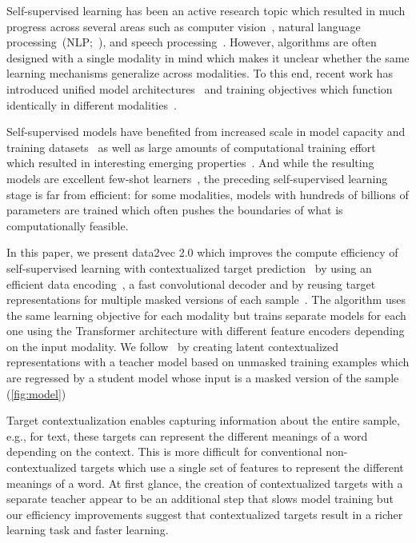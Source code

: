 \documentclass[nohyperref]{article}
\theoremstyle{plain}
\theoremstyle{definition}
\theoremstyle{remark}
\newcommand{\name}{data2vec 2.0}
\begin{document}
Self-supervised learning has been an active research topic which resulted in much progress across several areas such as computer vision~\citep{grill2020byol,bao2021beit,he2021mae}, natural language processing~(NLP;~\citealt{radford2018unsup,devlin2018bert,raffel2019t5,brown2020gpt3}), and speech processing~\citep{oord2018cpc,schneider2019wav2vec,baevski2020wav,hsu2020hubert,baevski2021unsupervised,babu2022xlsr}.
However, algorithms are often designed with a single modality in mind which makes it unclear whether the same learning mechanisms generalize across modalities.
To this end, recent work has introduced unified model architectures~\citep{jaegle2021perceiver,jaegle2022perceiverio} and training objectives which function identically in different modalities~\citep{baevski2022d2v}.

Self-supervised models have benefited from increased scale in model capacity and training datasets~\citep{brown2020gpt3} as well as large amounts of computational training effort~\citep{hoffmann2022chinchilla} which resulted in interesting emerging properties~\citep{wei2022emergent}.
And while the resulting models are excellent few-shot learners~\citep{brown2020gpt3}, the preceding self-supervised learning stage is far from efficient: for some modalities,
models with hundreds of billions of parameters are trained which often pushes the boundaries of what is computationally feasible. 

In this paper, we present \name{} which improves the compute efficiency of self-supervised learning with  contextualized target prediction~\citep{baevski2022d2v} by using an efficient data encoding~\citep{he2021mae}, a fast convolutional decoder and by reusing target representations for multiple masked versions of each sample~\citep{assran2022masked,girdhar2022omnimae}. 
The algorithm uses the same learning objective for each modality but trains separate models for each one using the Transformer architecture with different feature encoders depending on the input modality.
We follow~\citet{baevski2022d2v} by creating latent contextualized representations with a teacher model based on unmasked training examples which are regressed by a student model whose input is a masked version of the sample (\autoref{fig:model}) 

Target contextualization enables capturing information about the entire sample, e.g., for text, these targets can represent the different meanings of a word depending on the context.
This is more difficult for conventional non-contextualized targets which use a single set of features to represent the different meanings of a word.
At first glance, the creation of contextualized targets with a separate teacher appear to be an additional step that slows model training but our efficiency improvements suggest that contextualized targets result in a richer learning task and faster learning.
\end{document}
